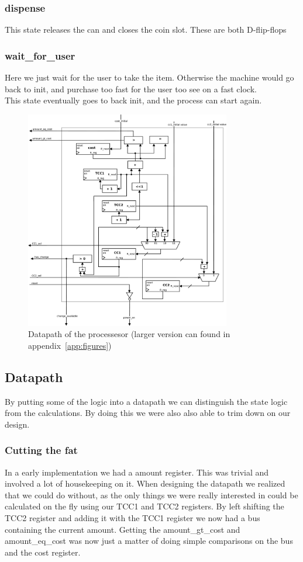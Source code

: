 \subsubsection{dispense}
This state releases the can and closes the coin slot. These are both D-flip-flops

\subsubsection{wait\_for\_user}
Here we just wait for the user to take the item. Otherwise the machine would go back to init, and purchase too fast for the user too see on a fast clock.\\
This state eventually goes to back init, and the process can start again.

\begin{figure}
\centering
\includegraphics[width=0.8\textwidth]{fig/datapath.pdf}
\caption{Datapath of the processesor (larger version can found in appendix~\ref{app:figures})}
\label{fig:datapath_small}
\end{figure}

\subsection{Datapath}

By putting some of the logic into a datapath we can distinguish the state logic from the calculations. By doing this we were also also able to trim down on our design.
\subsubsection{Cutting the fat}
In a early implementation we had a amount register. This was trivial and involved a lot of housekeeping on it. When designing the datapath we realized that we could do without, as the only things we were really interested in could be calculated on the fly using our TCC1 and TCC2 registers. By left shifting the TCC2 register and adding it with the TCC1 register we now had a bus containing the current amount. Getting the amount\_gt\_cost and amount\_eq\_cost was now just a matter of doing simple comparisons on the bus and the cost register.
